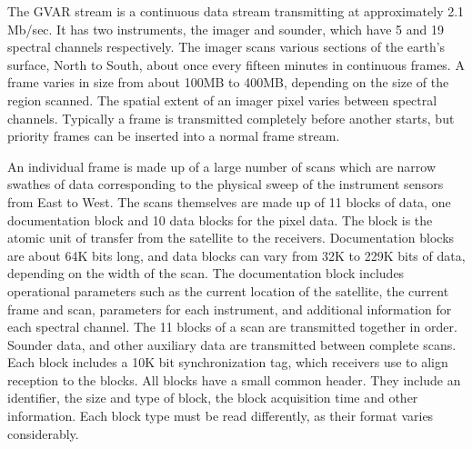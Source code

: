 \documentclass[10pt,letter]{article}
\begin{document}
\begin{multicols}{2}
The GVAR stream is a continuous data stream transmitting at
approximately 2.1 Mb/sec.  It has two instruments, the imager and
sounder, which have 5 and 19 spectral channels respectively.  
The imager scans various sections of the earth's surface, North to
South, about once every fifteen minutes in continuous frames.  A frame
varies in size from about 100MB to 400MB, depending on the size of the
region scanned.  The spatial extent of an imager pixel varies between
spectral channels.  Typically a frame is transmitted completely before
another starts, but priority frames can be inserted into a normal
frame stream.

An individual frame is made up of a large number of scans which are
narrow swathes of data corresponding to the physical sweep of the
instrument sensors from East to West.  The scans themselves are made
up of 11 blocks of data, one documentation block and 10 data blocks
for the pixel data.  The block is the atomic unit of transfer from the
satellite to the receivers.  Documentation blocks are about 64K bits
long, and data blocks can vary from 32K to 229K bits of data, depending
on the width of the scan.  The documentation block includes operational
parameters such as the current location of the satellite, the current
frame and scan, parameters for each instrument, and additional
information for each spectral channel.  The 11 blocks of a scan are
transmitted together in order.  Sounder data, and other auxiliary data
are transmitted between complete scans.
%
Each block includes a 10K bit synchronization tag, which receivers use
to align reception to the blocks.  All blocks have a small common
header.  They include an identifier, the size and type of block, the
block acquisition time and other information.  Each block type must be
read differently, as their format varies considerably.

\end{multicols}
\end{document}
